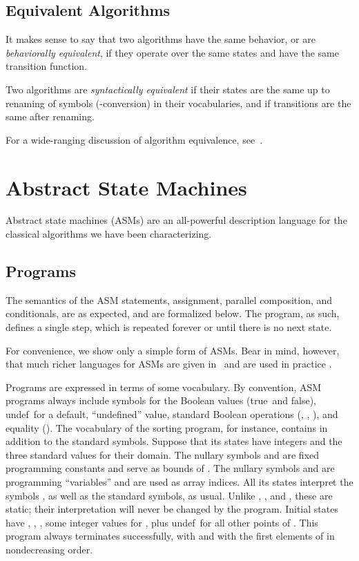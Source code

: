 \documentclass[copyright,creativecommons,english]{eptcs}
\newcommand{\True}{\textsf{true}}
\newcommand{\False}{\textsf{false}}
\newcommand{\Undef}{\textsf{undef}}
\begin{document}
\subsection{Equivalent Algorithms}

It makes sense to say that two algorithms have the same behavior, or are \emph{behaviorally equivalent}, if they operate over the same states and have the same transition function.

Two algorithms are \emph{syntactically equivalent} if their states are the same up to renaming of symbols (-conversion)
in their vocabularies, and if transitions are the same after renaming.

For a wide-ranging discussion of algorithm equivalence, see~\cite{same}.

\section{Abstract State Machines}\label{sec:asm}

Abstract state machines (ASMs) are an all-powerful description language for the classical algorithms we have been characterizing.

\subsection{Programs}

The semantics of the ASM statements, assignment, parallel composition, and
conditionals, are as expected, and are formalized below.
The program, as such, defines a single step, which is repeated forever or until
there is no next state.

For convenience,
we show only a simple form of ASMs.
Bear in mind, however, that much
richer languages for ASMs are given in~\cite{Gurevich94b} and are used in practice
\cite{GuScVe01b}.

Programs are expressed in terms of some vocabulary.
By convention, ASM programs always include symbols for the Boolean values (\True\ and \False), \Undef\ for a default, ``undefined'' value, standard Boolean operations
(, , ), and equality ().
The vocabulary of the sorting program, for instance, contains  in addition to the standard symbols.
Suppose that its states have integers and the three standard values for their domain.
The nullary symbols  and  are fixed programming constants and serve as bounds of .
The nullary symbols  and  are programming ``variables'' and are used as array indices.
All its states interpret the symbols , as well as the standard symbols, as usual.
Unlike , , and , these are static; their
interpretation will never be changed by the program.
Initial states have , , , some integer values for ,
plus \Undef\ for all other points of .
This program always terminates successfully, with 
and with the first  elements of  in nondecreasing order.
\end{document}
